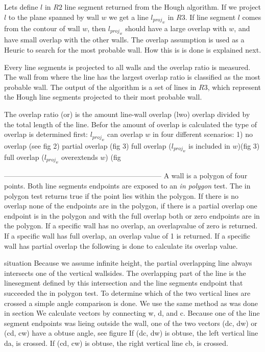\documentclass[10pt]{article}
\begin{document}
	Lets define $l$ in $R2$ line segment returned from the Hough algorithm.
	If we project $l$ to the plane spanned by wall $w$ we get a line $l_{proj_w}$ in $R3$.
	If line segment $l$ comes from the contour of wall $w$, then $l_{proj_w}$ should have a large overlap with $w$, and have small overlap with the other walls.
	The overlap assumption is used as a Heuric to search for the most probable wall. How this is is done is explained next.

	Every line segments is projected to all walls and the overlap ratio is
	measured. 	The wall from where the line has the largest overlap ratio is
	classified as the most probable wall.
	The output of the algorithm is a set of lines in $R3$, which represent the
	Hough line segments projected to their most probable wall.

	The overlap ratio (or) is the amount line-wall overlap (lwo) overlap divided by the total length of the line. 
	Befor the amount of overlap is calculated the type of overlap is determined first:
	$l_{proj_w}$ can overlap $w$ in four different scenarios:
		1) no overlap (see fig %
		2) partial overlap (fig %
		3) full overlap ($l_{proj_w}$ is included in $w$)(fig %
		3) full overlap ($l_{proj_w}$ overextends $w$) (fig %

------------------------------------------------------------------
	A wall is a polygon of four points. Both line segments endpoints are exposed to an \emph{in polygon} test. 
	The in polygon test returns true if the point lies within the polygon.
	If there is no overlap none of the endpoints are in the polygon, if there is a partial overlap one endpoint is in the polygon and with the full overlap both or zero endpoints are in the polygon.
	If a specific wall has no overlap, an overlapvalue of zero is returned.
	If a specific wall has full overlap, an overlap value of 1 is returned.
	If a specific wall has partial overlap the following is done to calculate its overlap value.
	
	situation
	Because we assume infinite height, the partial overlapping line always intersects one of the vertical wallsides.
	The overlapping part of the line is the linesegment defined by this intersection and the line segments endpoint that succeeded the in polygon test.
	To determine which of the two vertical lines are crossed a simple angle comparison is done.
	We use the same method as was done in section %
	We calculate vectors by connecting w, d, and c.
	Because one of the line segment endpoints was lieing outside the wall, one of the two vectors (dc, dw) or (cd, cw) have a obtuse angle, see figure %
	If (dc, dw) is obtuse, the left vertical line da, is crossed. 
	If (cd, cw) is obtuse, the right vertical line cb, is crossed. 
\end{document}
